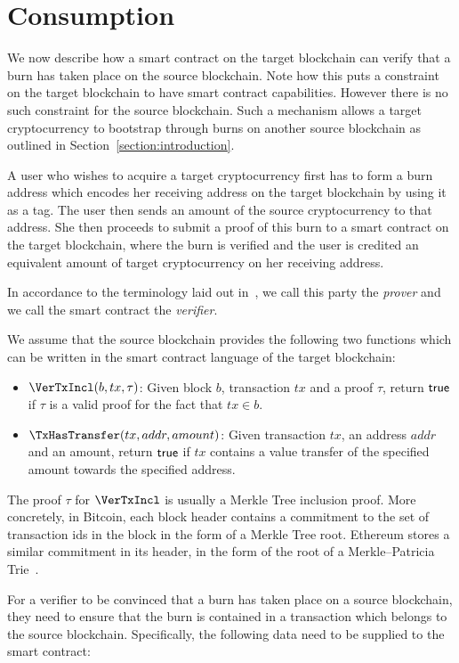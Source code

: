 \section{Consumption}

We now describe how a smart contract on the target blockchain can verify that a burn has taken place on the source blockchain. Note how this puts a constraint on the target blockchain to have smart contract capabilities. However there is no such constraint for the source blockchain. Such a mechanism allows a target cryptocurrency to bootstrap through burns on another source blockchain as outlined in Section~\ref{section:introduction}.

A user who wishes to acquire a target cryptocurrency first has to form a burn address which encodes her receiving address on the target blockchain by using it as a tag. The user then sends an amount of the source cryptocurrency to that address. She then proceeds to submit a proof of this burn to a smart contract on the target blockchain, where the burn is verified and the user is credited an equivalent amount of target cryptocurrency on her receiving address.

In accordance to the terminology laid out in~\cite{pow-sidechains}, we call this party the \emph{prover} and we call the smart contract the \emph{verifier}.

We assume that the source blockchain provides the following two functions which can be written in the smart contract language of the target blockchain:

\begin{itemize}
  \item $\VerTxIncl(b, tx, \tau)$: Given block $b$, transaction $tx$ and a proof $\tau$, return $\mathsf{true}$ if $\tau$ is a valid proof for the fact that $tx \in b$.
  \item $\TxHasTransfer(tx, addr, amount)$: Given transaction $tx$, an address $addr$ and an amount, return $\mathsf{true}$ if $tx$ contains a value transfer of the specified amount towards the specified address.
\end{itemize}

The proof $\tau$ for $\VerTxIncl$ is usually a Merkle Tree inclusion proof. More concretely, in Bitcoin, each block header contains a commitment to the set of transaction ids in the block in the form of a Merkle Tree root. Ethereum stores a similar commitment in its header, in the form of the root of a Merkle--Patricia Trie~\cite{wood2014ethereum}.

For a verifier to be convinced that a burn has taken place on a source blockchain, they need to ensure that the burn is contained in a transaction which belongs to the source blockchain. Specifically, the following data need to be supplied to the smart contract:

